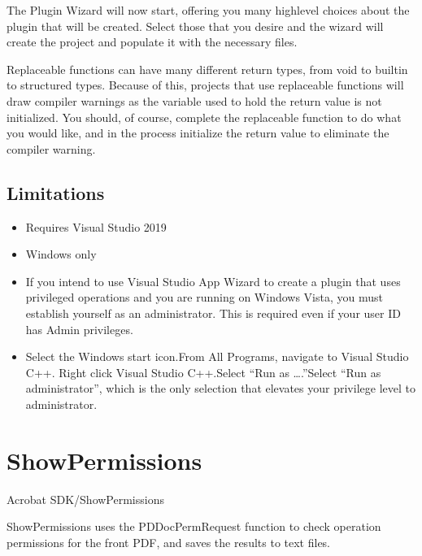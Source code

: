 \documentclass[letterpaper,12pt,english,openany,oneside]{sphinxmanual}
\begin{document}
The Plugin Wizard will now start, offering you many high\sphinxhyphen{}level choices about the plugin that will be created. Select those that you desire and the wizard will create the project and populate it with the necessary files.

Replaceable functions can have many different return types, from void to built\sphinxhyphen{}in to structured types. Because of this, projects that use replaceable functions will draw compiler warnings as the variable used to hold the return value is not initialized. You should, of course, complete the replaceable function to do what you would like, and in the process initialize the return value to eliminate the compiler warning.


\subsection{Limitations}
\label{\detokenize{Samples_Tools:limitations}}\begin{itemize}
\item {} 
Requires Visual Studio 2019

\item {} 
Windows only

\item {} 
If you intend to use Visual Studio App Wizard to create a plugin that uses privileged operations and you are running on Windows Vista, you must establish yourself as an administrator. This is required even if your user ID has Admin privileges.

\item {} 
Select the Windows start icon.From All Programs, navigate to Visual Studio C++. Right click Visual Studio C++.Select “Run as ….”Select “Run as administrator”, which is the only selection that elevates your privilege level to administrator.

\end{itemize}


\section{ShowPermissions}
\label{\detokenize{Samples_Tools:showpermissions}}\label{\detokenize{Samples_Tools:location-1}}

Acrobat SDK/ShowPermissions

\label{\detokenize{Samples_Tools:description-1}}

ShowPermissions uses the PDDocPermRequest function to check operation permissions for the front PDF, and saves the results to text files.
\end{document}
